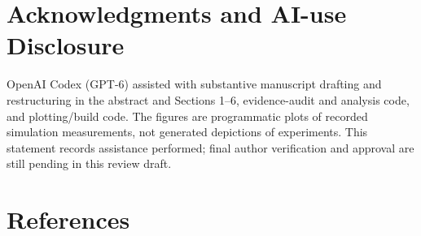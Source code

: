 \documentclass[letterpaper,10pt,conference]{ieeeconf}
\begin{document}
\section*{Acknowledgments and AI-use Disclosure}

OpenAI Codex (GPT-6) assisted with substantive manuscript drafting and restructuring in the abstract and Sections 1--6, evidence-audit and analysis code, and plotting/build code. The figures are programmatic plots of recorded simulation measurements, not generated depictions of experiments. This statement records assistance performed; final author verification and approval are still pending in this review draft.

\section*{References}\small
\end{document}

